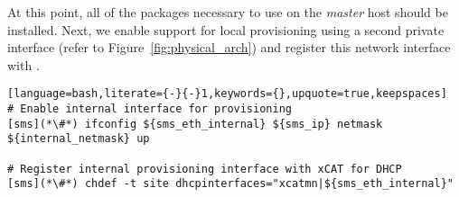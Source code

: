 At this point, all of the packages necessary to use \xCAT{} on the {\em master}
host should be installed. Next, we enable support for local provisioning using
a second private interface (refer to Figure~\ref{fig:physical_arch}) and
register this network interface with \xCAT{}.

\begin{lstlisting}[language=bash,literate={-}{-}1,keywords={},upquote=true,keepspaces]
# Enable internal interface for provisioning
[sms](*\#*) ifconfig ${sms_eth_internal} ${sms_ip} netmask ${internal_netmask} up

# Register internal provisioning interface with xCAT for DHCP
[sms](*\#*) chdef -t site dhcpinterfaces="xcatmn|${sms_eth_internal}"

\end{lstlisting}
